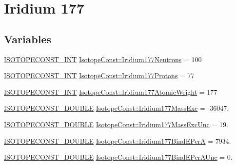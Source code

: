 \hypertarget{group___isotope_const-_iridium-_ir177}{}\section{Iridium 177}
\label{group___isotope_const-_iridium-_ir177}
\subsection*{Variables}
\begin{DoxyCompactItemize}
\item 
\mbox{\hyperlink{group___isotope_const-_macros_ga5f18360b3e99483a35c32d789e62621c}{I\+S\+O\+T\+O\+P\+E\+C\+O\+N\+S\+T\+\_\+\+I\+NT}} \mbox{\hyperlink{group___isotope_const-_iridium-_ir177_ga5a58134a6f56386cb0e886d2fe888a2a}{Isotope\+Const\+::\+Iridium177\+Neutrons}} = 100
\item 
\mbox{\hyperlink{group___isotope_const-_macros_ga5f18360b3e99483a35c32d789e62621c}{I\+S\+O\+T\+O\+P\+E\+C\+O\+N\+S\+T\+\_\+\+I\+NT}} \mbox{\hyperlink{group___isotope_const-_iridium-_ir177_gad3ac75ab6cc05520ec1c900eb7056e68}{Isotope\+Const\+::\+Iridium177\+Protons}} = 77
\item 
\mbox{\hyperlink{group___isotope_const-_macros_ga5f18360b3e99483a35c32d789e62621c}{I\+S\+O\+T\+O\+P\+E\+C\+O\+N\+S\+T\+\_\+\+I\+NT}} \mbox{\hyperlink{group___isotope_const-_iridium-_ir177_gad6b8d69649390a48e21d7ddbd297da73}{Isotope\+Const\+::\+Iridium177\+Atomic\+Weight}} = 177
\item 
\mbox{\hyperlink{group___isotope_const-_macros_ga8f45a7272ce02c0b4c65c44636ed719a}{I\+S\+O\+T\+O\+P\+E\+C\+O\+N\+S\+T\+\_\+\+D\+O\+U\+B\+LE}} \mbox{\hyperlink{group___isotope_const-_iridium-_ir177_gae3c4fccd40a03242c4b4a9ca08afb5a4}{Isotope\+Const\+::\+Iridium177\+Mass\+Exc}} = -\/36047.
\item 
\mbox{\hyperlink{group___isotope_const-_macros_ga8f45a7272ce02c0b4c65c44636ed719a}{I\+S\+O\+T\+O\+P\+E\+C\+O\+N\+S\+T\+\_\+\+D\+O\+U\+B\+LE}} \mbox{\hyperlink{group___isotope_const-_iridium-_ir177_ga5bf16ed53ce35d0049d652529971b750}{Isotope\+Const\+::\+Iridium177\+Mass\+Exc\+Unc}} = 19.
\item 
\mbox{\hyperlink{group___isotope_const-_macros_ga8f45a7272ce02c0b4c65c44636ed719a}{I\+S\+O\+T\+O\+P\+E\+C\+O\+N\+S\+T\+\_\+\+D\+O\+U\+B\+LE}} \mbox{\hyperlink{group___isotope_const-_iridium-_ir177_ga146755526c560c032ca2f1f908997aff}{Isotope\+Const\+::\+Iridium177\+Bind\+E\+PerA}} = 7934.
\item 
\mbox{\hyperlink{group___isotope_const-_macros_ga8f45a7272ce02c0b4c65c44636ed719a}{I\+S\+O\+T\+O\+P\+E\+C\+O\+N\+S\+T\+\_\+\+D\+O\+U\+B\+LE}} \mbox{\hyperlink{group___isotope_const-_iridium-_ir177_ga7c7dbedbd118d2e2062976a95019f5a3}{Isotope\+Const\+::\+Iridium177\+Bind\+E\+Per\+A\+Unc}} = 0.

\end{DoxyCompactItemize}
